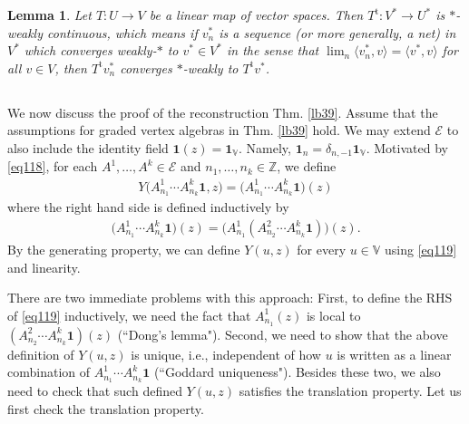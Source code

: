 \documentclass[11pt,b5paper,notitlepage]{article}
\theoremstyle{definition}
\theoremstyle{plain}
\newtheorem{lm}[df]{Lemma}
\newcommand{\mc}{\mathcal}
\newcommand{\tr}{\mathrm{t}} %
\newcommand{\id}{\mathbf{1}}
\newcommand{\bk}[1]{\langle {#1}\rangle}
\newcommand{\Vbb}{\mathbb V}
\newcommand{\Zbb}{\mathbb Z}
\numberwithin{equation}{section}
\begin{document}
\begin{lm}
Let $T:U\rightarrow V$ be a linear map of vector spaces. Then $T^\tr:V^*\rightarrow U^*$ is $*$-weakly  continuous, which means if $v^*_n$ is a sequence (or more generally, a net) in $V^*$ which converges weakly-$*$ to $v^*\in V^*$ in the sense that $\lim_n \bk{v_n^*,v}=\bk{v^*,v}$ for all $v\in V$, then $T^\tr v^*_n$ converges $*$-weakly  to $T^\tr v^*$.
\end{lm}





\subsection{}

We now discuss the proof of the reconstruction Thm. \ref{lb39}. Assume that the assumptions for graded vertex algebras in Thm. \ref{lb39} hold. We may extend $\mc E$ to also include the identity field $\id(z)=\id_\Vbb$. Namely, $\id_n=\delta_{n,-1}\id_\Vbb$. Motivated by \eqref{eq118}, for each $A^1,\dots,A^k\in\mc E$ and $n_1,\dots,n_k\in\Zbb$, we define
\begin{align}
	Y\big(A^1_{n_1}\cdots A^k_{n_k}\id,z\big)=\big(A^1_{n_1}\cdots A^k_{n_k}\id\big)(z)\label{eq119}
\end{align}
where the right hand side is defined inductively by
\begin{align*}
	\big(A^1_{n_1}\cdots A^k_{n_k}\id\big)(z)=\big(A^1_{n_1}(A^2_{n_2}\cdots A^k_{n_k}\id)\big)(z).
\end{align*}
By the generating property, we can define $Y(u,z)$ for every $u\in\Vbb$ using \eqref{eq119} and linearity. 

There are two immediate problems with this approach: First, to define the RHS of \eqref{eq119} inductively, we need the fact that $A^1_{n_1}(z)$ is local to $(A^2_{n_2}\cdots A^k_{n_k}\id)(z)$ (``Dong's lemma"). Second, we need to show that the above definition of $Y(u,z)$ is unique, i.e., independent of how $u$ is written as a linear combination of  $A^1_{n_1}\cdots A^k_{n_k}\id$ (``Goddard uniqueness"). Besides these two, we also need to check that such defined $Y(u,z)$ satisfies the translation property. Let us first check the translation property.



\subsection{}
\end{document}
